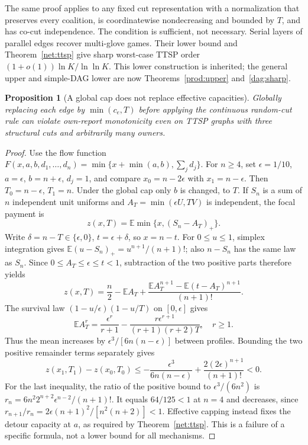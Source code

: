 \documentclass[11pt]{article}
\newtheorem{proposition}[theorem]{Proposition}
\theoremstyle{definition}\newtheorem{definition}[theorem]{Definition}
\theoremstyle{remark}\newtheorem{remark}[theorem]{Remark}
\newcommand{\E}{\mathbb E}
\begin{document}
The same proof applies to any fixed cut representation with a normalization
that preserves every coalition, is coordinatewise nondecreasing and bounded
by $T$, and has co-cut independence.  The condition is sufficient, not necessary.
Serial layers of parallel edges recover multi-glove games.  Their lower
bound and Theorem~\ref{net:ttsp} give sharp worst-case TTSP order
$(1+o(1))\ln K/\ln\ln K$.  This lower construction is inherited; the general
upper and simple-DAG lower are now Theorems~\ref{prod:upper} and~\ref{dag:sharp}.

\begin{proposition}[A global cap does not replace effective capacities]
\label{net:global-cap}
Globally replacing each edge by $\min(c_e,T)$ before applying the continuous
random-cut rule can violate own-report monotonicity even on TTSP graphs
with three structural cuts and arbitrarily many owners.
\end{proposition}
\begin{proof}
Use the flow function
$F(x,a,b,d_1,\ldots,d_n)=\min\{x+\min(a,b),\sum_jd_j\}$.
For $n\ge4$, set $\epsilon=1/10$, $a=\epsilon$, $b=n+\epsilon$,
$d_j=1$, and compare $x_0=n-2\epsilon$ with $x_1=n-\epsilon$.
Then $T_0=n-\epsilon$, $T_1=n$.  Under the global cap only $b$ is changed,
to $T$.  If $S_n$ is a sum of $n$ independent unit uniforms and
$A_T=\min(\epsilon U,TV)$ is independent, the focal payment is
\[
 z(x,T)=\E\min\{x,(S_n-A_T)_+\}.
\]
Write $\delta=n-T\in\{\epsilon,0\}$, $t=\epsilon+\delta$, so $x=n-t$.
For $0\le u\le1$, simplex integration gives
$\E(u-S_n)_+=u^{n+1}/(n+1)!$; also $n-S_n$ has the same law as $S_n$.
Since $0\le A_T\le\epsilon\le t<1$, subtraction of the two positive parts
therefore yields
\[
 z(x,T)=\frac n2-\E A_T+
 \frac{\E A_T^{n+1}-\E(t-A_T)^{n+1}}{(n+1)!}.
\]
The survival law $(1-u/\epsilon)(1-u/T)$ on $[0,\epsilon]$ gives
\[
 \E A_T^r=\frac{\epsilon^r}{r+1}
 -\frac{r\epsilon^{r+1}}{(r+1)(r+2)T},\quad r\ge1.
\]
Thus the mean increases by $\epsilon^3/[6n(n-\epsilon)]$ between profiles.
Bounding the two positive remainder terms separately gives
\[
 z(x_1,T_1)-z(x_0,T_0)
 \le-\frac{\epsilon^3}{6n(n-\epsilon)}
       +\frac{2(2\epsilon)^{n+1}}{(n+1)!}<0.
\]
For the last inequality, the ratio of the positive bound to
$\epsilon^3/(6n^2)$ is
$r_n=6n^2 2^{n+2}\epsilon^{n-2}/(n+1)!$.
It equals $64/125<1$ at $n=4$ and decreases, since
$r_{n+1}/r_n=2\epsilon(n+1)^2/[n^2(n+2)]<1$.
Effective capping instead fixes the detour capacity at $a$, as required by
Theorem~\ref{net:ttsp}.  This is a failure of a specific formula, not a
lower bound for all mechanisms.
\end{proof}
\end{document}
